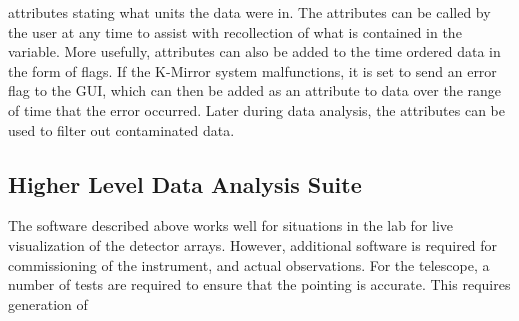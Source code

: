 \documentclass[manuscript]{aastex}
\begin{document}
attributes stating what units the data were in. The attributes can be called by the user at any time to assist with recollection of what is contained in the variable. More usefully, attributes can also be added to the time ordered data in the form of flags. If the K-Mirror system malfunctions, it is set to send an error flag to the GUI, which can then be added as an attribute to data over the range of time that the error occurred. Later during data analysis, the attributes can be used to filter out contaminated data. 

\subsection{Higher Level Data Analysis Suite}

The software described above works well for situations in the lab for live visualization of the detector arrays. However, additional software is required for commissioning of the instrument, and actual observations. For the telescope, a number of tests are required to ensure that the pointing is accurate. This requires generation of 

\end{document}
